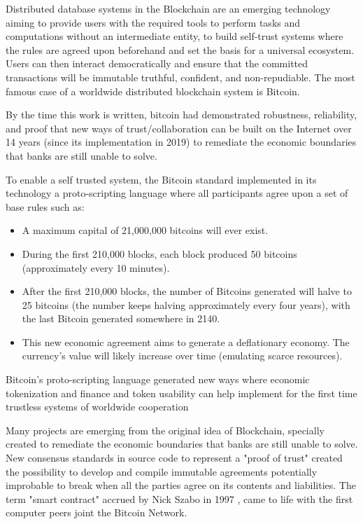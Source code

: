 Distributed database systems in the Blockchain are an emerging technology aiming to provide users with the required tools to perform tasks and computations without an intermediate entity, to build self-trust systems where the rules are agreed upon beforehand and set the basis for a universal ecosystem. Users can then interact democratically and ensure that the committed transactions will be immutable truthful, confident, and non-repudiable.
The most famous case of a worldwide distributed blockchain system is Bitcoin. 

By the time this work is written, bitcoin had demonstrated robustness, reliability, and proof that new ways of trust/collaboration can be built on the Internet over 14 years (since its implementation in 2019) to remediate the economic boundaries that banks are still unable to solve. \cite{nakamoto2008bitcoin}

To enable a self trusted system, the Bitcoin standard implemented in its technology a proto-scripting language where all participants agree upon a set of base rules such as:
\begin{itemize}
\item A maximum capital of 21,000,000 bitcoins will ever exist. 
\item During the first 210,000 blocks, each block produced 50 bitcoins (approximately every 10 minutes).
\item After the first 210,000 blocks, the number of Bitcoins generated will halve to 25 bitcoins (the number keeps halving approximately every four years), with the last Bitcoin generated somewhere in 2140.
\item This new economic agreement aims to generate a deflationary economy. The currency's value will likely increase over time (emulating scarce resources). 
\end{itemize}

Bitcoin's proto-scripting language generated new ways where economic tokenization \cite{malinova2018tokenomics} and finance and token usability can help implement for the first time trustless systems of worldwide cooperation

Many projects are emerging from the original idea of Blockchain, specially created to remediate the economic boundaries that banks are still unable to solve. New consensus standards in source code to represent a "proof of trust" created the possibility to develop and compile immutable agreements potentially improbable to break when all the parties agree on its contents and liabilities. The term "smart contract" accrued by Nick Szabo in 1997 \cite{szabo1997formalizing}, came to life with the first computer peers joint the Bitcoin Network.

